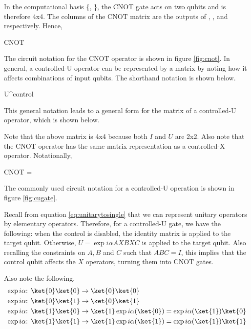 In the computational basis \{, \}, the \textsc{CNOT} gate acts on two qubits and is therefore 4x4. The columns of the \textsc{CNOT} matrix are the outputs of , ,  and  respectively. Hence,

\beq
\textsc{CNOT} \equiv {}
\eeq


The circuit notation for the \textsc{CNOT} operator is shown in figure \ref{fig:cnot}. In general, a controlled-U operator can be represented by a matrix by noting how it affects combinations of input qubits. The shorthand notation is shown below.

\beq
{}  \rightarrow {}U^{control}
\eeq

This general notation leads to a general form for the matrix of a controlled-U operator, which is shown below.

\beq
{} \equiv {}
\eeq

Note that the above matrix is 4x4 because both $I$ and $U$ are 2x2. Also note that the \textsc{CNOT} operator has the same matrix representation as a controlled-X operator. Notationally,

\beq
\textsc{CNOT} \equiv {} = 
\eeq

The commonly used circuit notation for a controlled-U operation is shown in figure \ref{fig:cugate}.


Recall from equation \ref{eq:unitarytosingle} that we can represent unitary operators by elementary operators. Therefore, for a controlled-U gate, we have the following: when the control is disabled, the identity matrix is applied to the target qubit. Otherwise, $U = \exp{i\alpha}AXBXC$ is applied to the target qubit. Also recalling the constraints on $A,B$ and $C$ such that $ABC = I$, this implies that the control qubit affects the $X$ operators, turning them into \textsc{CNOT} gates. 

Also note the following.
\begin{align}
\exp{i\alpha}\text{: } \ket{0}\ket{0} &\rightarrow \ket{0}\ket{0}\\
\exp{i\alpha}\text{: } \ket{0}\ket{1} &\rightarrow \ket{0}\ket{1}\\
\exp{i\alpha}\text{: } \ket{1}\ket{0} &\rightarrow \ket{1}\exp{i\alpha}(\ket{0}) = \exp{i\alpha}(\ket{1})\ket{0}\\
\exp{i\alpha}\text{: } \ket{1}\ket{1} &\rightarrow \ket{1}\exp{i\alpha}(\ket{1}) = \exp{i\alpha}(\ket{1})\ket{1}
\end{align}

